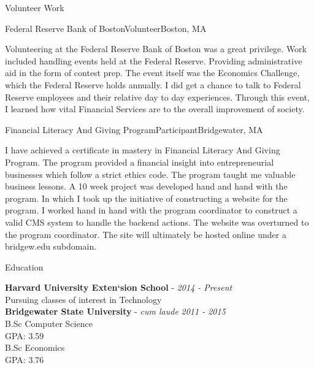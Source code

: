 \documentclass{resume} %
\begin{document}
\begin{rSection}{Volunteer Work}

\begin{rSubsection}{Federal Reserve Bank of Boston}{}{Volunteer}{Boston, MA}
 	       \item Volunteering at the Federal Reserve Bank of Boston was a great privilege. Work included handling events held at the Federal Reserve. Providing administrative aid in the form of contest prep. The event itself was the Economics Challenge, which the Federal Reserve holds annually. I did get a chance to talk to Federal Reserve employees and their relative day to day experiences. Through this event, I learned how vital Financial Services are to the overall improvement of society.
 	 \end{rSubsection}	     


\begin{rSubsection}{Financial Literacy And Giving Program}{}{Participant}{Bridgewater, MA}
 	       \item I have achieved a certificate in mastery in Financial Literacy And Giving Program. The program provided a financial insight into entrepreneurial businesses which follow a strict ethics code. The program taught me valuable business lessons. A 10 week project was developed hand and hand with the program. In which I took up the initiative of constructing a website for the program. I worked hand in hand with the program coordinator to construct a valid CMS system to handle the backend actions. The website was overturned to the program coordinator. The site will ultimately be hosted online under a bridgew.edu subdomain.
\end{rSubsection}


\end{rSection}



\begin{rSection}{Education}

{\bf Harvard University Exten`sion School} - {\em 2014 - Present} \vspace{0.5em}\\ 
Pursuing classes of interest in Technology \\

{\bf Bridgewater State University} - \textit{cum laude} \hfill {\em 2011 - 2015} \vspace{0.5em}\\ 
B.Sc Computer Science \\
GPA: 3.59 \vspace{0.5em}\\
B.Sc Economics \\
GPA: 3.76

\end{rSection}
\end{document}
